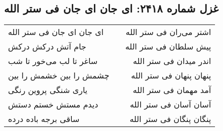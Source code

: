 \begin{center}
\section*{غزل شماره ۲۴۱۸: ای جان ای جان فی ستر الله}
\label{sec:2418}
\begin{longtable}{l p{0.5cm} r}
ای جان ای جان فی ستر الله
&&
اشتر می‌ران فی ستر الله
\\
جام آتش درکش درکش
&&
پیش سلطان فی ستر الله
\\
ساغر تا لب می‌خور تا شب
&&
اندر میدان فی ستر الله
\\
چشمش را بین خشمش را بین
&&
پنهان پنهان فی ستر الله
\\
یاری شنگی پروین رنگی
&&
آمد مهمان فی ستر الله
\\
دیدم مستش خستم دستش
&&
آسان آسان فی ستر الله
\\
ساقی برجه باده درده
&&
پنگان پنگان فی ستر الله
\\
\end{longtable}
\end{center}
